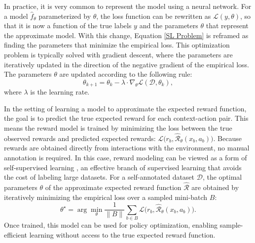 \documentclass[./dissertation.tex]{subfiles}
\begin{document}
In practice, it is very common to represent the model using a neural network. For a model $\hat{f}_\theta$ parameterized by $\theta$, the loss function can be rewritten as $\mathcal{L}(y,\theta)$, so that it is now a function of the true labels $y$ and the parameters $\theta$ that represent the approximate model. With this change, Equation \ref{SL Problem} is reframed as finding the parameters that minimize the empirical loss. This optimization problem is typically solved with gradient descent, where the parameters are iteratively updated in the direction of the negative gradient of the empirical loss. The parameters $\theta$ are updated according to the following rule:
\begin{equation}
\theta_{k+1} = \theta_k - \lambda \cdot \nabla_\theta \mathscr{L}(\mathcal{D},\theta_k),
\end{equation}
where $\lambda$ is the learning rate.

In the setting of learning a model to approximate the expected reward function, the goal is to predict the true expected reward for each context-action pair. This means the reward model is trained by minimizing the loss between the true observed rewards and predicted expected rewards: $\mathcal{L}\big(r_b,\hat{\mathcal{R}}_\theta(x_b,a_b)\big)$. Because rewards are obtained directly from interactions with the environment, no manual annotation is required. In this case, reward modeling can be viewed as a form of self-supervised learning \parencite{SelfSL}, an effective branch of supervised learning that avoids the cost of labeling large datasets. For a self-annotated dataset $\mathcal{D}$, the optimal parameters $\theta$ of the approximate expected reward function $\hat{\mathcal{R}}$ are obtained by iteratively minimizing the empirical loss over a sampled mini-batch $B$:
\begin{equation}
\theta^\star = 
\arg\min_\theta
\frac{1}{\|B\|} \sum_{b \in B}
\mathcal{L}\big(r_b,\hat{\mathcal{R}}_\theta(x_b,a_b)\big).
\label{Loss}
\end{equation}
Once trained, this model can be used for policy optimization, enabling sample-efficient learning without access to the true expected reward function.
\end{document}
